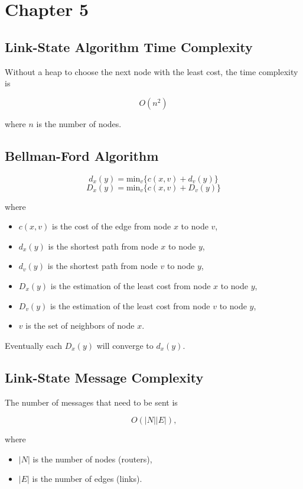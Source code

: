 \section{Chapter 5}

\subsection{Link-State Algorithm Time Complexity}

Without a heap to choose the next node with the least cost, the time complexity is

\begin{equation*}
    O(n^2)
\end{equation*}

where $n$ is the number of nodes.

\subsection {Bellman-Ford Algorithm}

\begin{equation*}
    d_x(y) = \text{min}_v \{c(x,v) + d_v(y)\}
\end{equation*}
\begin{equation*}
    D_x(y) = \text{min}_v \{c(x,v) + D_v(y)\}
\end{equation*}

where
\begin{itemize}
    \item $c(x,v)$ is the cost of the edge from node $x$ to node $v$,
    \item $d_x(y)$ is the shortest path from node $x$ to node $y$,
    \item $d_v(y)$ is the shortest path from node $v$ to node $y$,
    \item $D_x(y)$ is the estimation of the least cost from node $x$ to node $y$,
    \item $D_v(y)$ is the estimation of the least cost from node $v$ to node $y$,
    \item $v$ is the set of neighbors of node $x$.
\end{itemize}

Eventually each $D_x(y)$ will converge to $d_x(y)$.

\subsection{Link-State Message Complexity}

The number of messages that need to be sent is

\begin{equation*}
    O(|N| |E|)\text{,}
\end{equation*}

where
\begin{itemize}
    \item $|N|$ is the number of nodes (routers),
    \item $|E|$ is the number of edges (links).
\end{itemize}